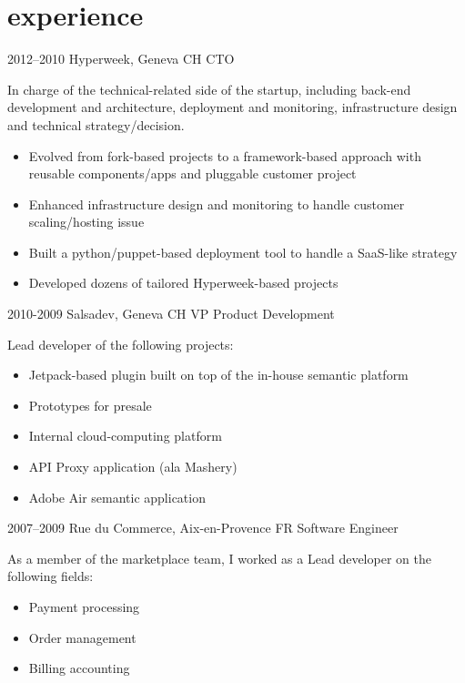 \documentclass[]{friggeri}
\begin{document}
\section{experience}

\begin{entrylist}
  \entry
    {2012–2010}
    {Hyperweek, Geneva CH}
    {CTO}
    {In charge of the technical-related side of the startup, including back-end development and architecture, deployment and monitoring, infrastructure design and technical strategy/decision.
    \begin{itemize}
    \item Evolved from fork-based projects to a framework-based approach with reusable components/apps and pluggable customer project
    \item Enhanced infrastructure design and monitoring to handle customer scaling/hosting issue
    \item Built a python/puppet-based deployment tool to handle a SaaS-like strategy
    \item Developed dozens of tailored Hyperweek-based projects
    \end{itemize}}
  \entry
    {2010-2009}
    {Salsadev, Geneva CH}
    {VP Product Development}
    {Lead developer of the following projects:
    \begin{itemize}
    \item Jetpack-based plugin built on top of the in-house semantic platform
    \item Prototypes for presale
    \item Internal cloud-computing platform
    \item API Proxy application (ala Mashery)
    \item Adobe Air semantic application
    \end{itemize}}
  \entry
    {2007–2009}
    {Rue du Commerce, Aix-en-Provence FR}
    {Software Engineer}
    {As a member of the marketplace team, I worked as a Lead developer on the following fields:
    \begin{itemize}
    \item Payment processing
    \item Order management
    \item Billing accounting
    \end{itemize}}
\end{entrylist}

\clearpage
\end{document}
